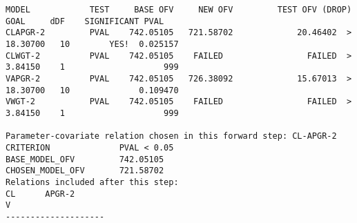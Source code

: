 {\tiny
\begin{verbatim}
MODEL            TEST     BASE OFV     NEW OFV         TEST OFV (DROP)    GOAL     dDF    SIGNIFICANT PVAL
CLAPGR-2         PVAL    742.05105   721.58702             20.46402  >  18.30700   10        YES!  0.025157 
CLWGT-2          PVAL    742.05105    FAILED                 FAILED  >   3.84150    1                    999
VAPGR-2          PVAL    742.05105   726.38092             15.67013  >  18.30700   10              0.109470 
VWGT-2           PVAL    742.05105    FAILED                 FAILED  >   3.84150    1                    999

Parameter-covariate relation chosen in this forward step: CL-APGR-2
CRITERION              PVAL < 0.05
BASE_MODEL_OFV         742.05105
CHOSEN_MODEL_OFV       721.58702
Relations included after this step:
CL      APGR-2  
V       
--------------------
\end{verbatim}
}
